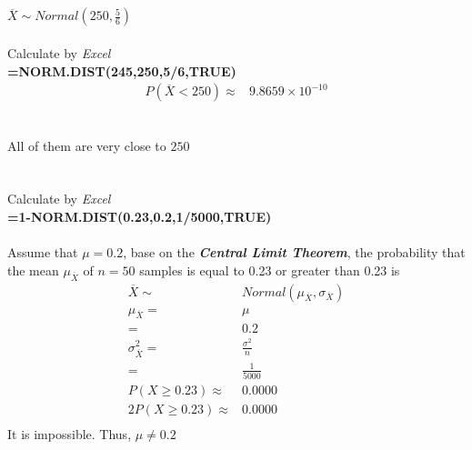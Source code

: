 \documentclass{article}
\begin{document}
        \subsection{}
            \paragraph{}
            $\overline{X}\sim Normal(250,\frac{5}{6})$
            \paragraph{}
            Calculate by \textit{Excel}\\
            \textbf{=NORM.DIST(245,250,5/6,TRUE)}
            \begin{equation*}
                \begin{split}
                    P(\overline{X}<250)\approx&9.8659\times10^{-10}\\
                \end{split}
            \end{equation*}
        \subsection{}
            \paragraph{}
            All of them are very close to $250$
    \section{}
        \paragraph{}
        Calculate by \textit{Excel}\\
        \textbf{=1-NORM.DIST(0.23,0.2,1/5000,TRUE)}
        \paragraph{}
        Assume that $\mu=0.2$, base on the \textbf{\textit{Central Limit Theorem}}, the probability that the mean $\mu_{\overline{X}}$ of $n=50$ samples is equal to 0.23 or greater than 0.23 is
        \begin{equation*}
            \begin{split}
                \overline{X}\sim& Normal(\mu_{\overline{X}},\sigma_{\overline{X}})\\
                \mu_{\overline{X}}=&\mu\\
                    =&0.2\\
                \sigma_{\overline{X}}^2=&\frac{\sigma^2}{n}\\
                    =&\frac{1}{5000}\\
                P(X\geq 0.23)\approx&0.0000\\
                2P(X\geq 0.23)\approx&0.0000\\
            \end{split}
        \end{equation*}
        It is impossible. Thus, $\mu\neq 0.2$
\end{document}
